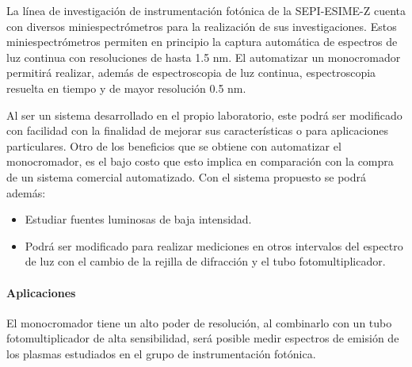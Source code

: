 La línea de investigación de instrumentación fotónica de la SEPI-ESIME-Z cuenta con diversos miniespectrómetros para la realización de sus investigaciones. Estos miniespectrómetros permiten en principio la captura automática de espectros de luz continua  con resoluciones de hasta 1.5 nm. El automatizar un monocromador permitirá realizar, además de espectroscopia de luz continua, espectroscopia resuelta en tiempo y de mayor resolución 0.5 nm.


Al ser un sistema desarrollado en el propio laboratorio, este podrá ser modificado con facilidad con la finalidad de mejorar sus características o para aplicaciones particulares. Otro de los beneficios que se obtiene con automatizar el monocromador, es el bajo costo que esto implica en comparación con la compra de un sistema comercial automatizado. Con el sistema propuesto se podrá además:
\begin{itemize}
\item Estudiar fuentes luminosas de baja intensidad.
\item Podrá ser modificado para realizar mediciones en otros intervalos del espectro de luz con el cambio de la rejilla de difracción y el tubo fotomultiplicador.
\end{itemize}

\paragraph{Aplicaciones} 
El monocromador tiene un alto poder de resolución, al combinarlo con un tubo fotomultiplicador de alta sensibilidad, será posible medir espectros de emisión de los plasmas estudiados en el grupo de instrumentación fotónica.
